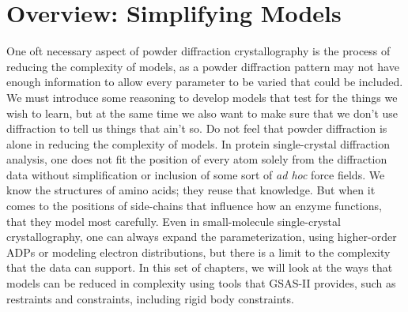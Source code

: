 \chapter{Overview: Simplifying Models}\label{Chap:simplify}
One oft necessary aspect of powder diffraction crystallography is the process of reducing the complexity of models, as a powder diffraction pattern may not have enough information to allow every parameter to be varied that could be included. 
We must introduce some reasoning to develop models that test for the things we wish to learn, but at the same time we also want to make sure that we don't use diffraction to tell us things that ain't so. 
Do not feel that powder diffraction is alone in reducing the complexity of models. 
In protein single-crystal diffraction analysis, one does not fit the position of every atom solely from the diffraction data without simplification or inclusion of some sort of \textit{ad hoc} force fields. 
We know the structures of amino acids; they reuse that knowledge. 
But when it comes to the positions of side-chains that influence how an enzyme functions, that they model most carefully. 
Even in small-molecule single-crystal crystallography, one can always expand the parameterization, using higher-order ADPs or modeling electron distributions, but there is a limit to the complexity that the data can support. 
In this set of chapters, we will look at the ways that models can be reduced in complexity using tools that GSAS-II provides, such as restraints and constraints, including rigid body constraints. 